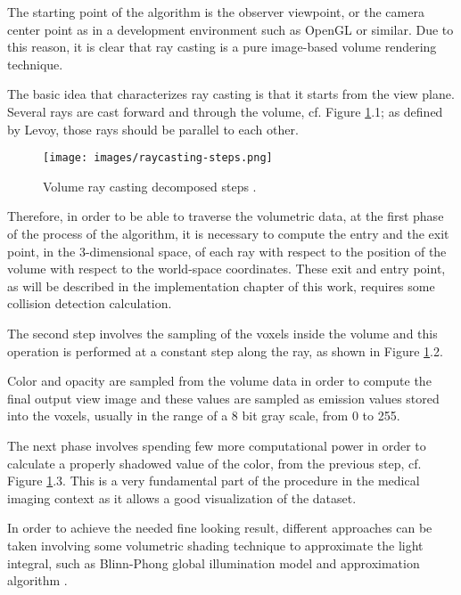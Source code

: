 \documentclass[12pt,a4paper]{extarticle}
\newcommand{\linespace}{\vspace{0pt}}
\begin{document}
The starting point of the algorithm is the observer viewpoint, or the camera center point as in a development environment such as OpenGL or similar. Due to this reason, it is clear that ray casting is a pure image-based volume rendering technique.
\linespace

The basic idea that characterizes ray casting is that it starts from the view plane. Several rays are cast forward and through the volume, cf. Figure \ref{fig:raycastingsteps}.1; as defined by Levoy, those rays should be parallel to each other.

\begin{figure}[hbtp]
\centering
\texttt{[image: images/raycasting-steps.png]}
\caption{Volume ray casting decomposed steps \cite{wiki_ray}.}
\label{fig:raycastingsteps}
\end{figure}

Therefore, in order to be able to traverse the volumetric data, at the first phase of the process of the algorithm, it is necessary to compute the entry and the exit point, in the 3-dimensional space, of each ray with respect to the position of the volume with respect to the world-space coordinates. %
These exit and entry point, as will be described in the implementation chapter of this work, requires some collision detection calculation. 
\linespace

The second step involves the sampling of the voxels inside the volume and this operation is performed at a constant step along the ray, as shown in Figure \ref{fig:raycastingsteps}.2.

Color and opacity are sampled from the volume data in order to compute the final output view image and these values are sampled as emission values stored into the voxels, usually in the range of a 8 bit gray scale, from 0 to 255.
\linespace

The next phase involves spending few more computational power in order to calculate a properly shadowed value of the color, from the previous step, cf. Figure \ref{fig:raycastingsteps}.3. This is a very fundamental part of the procedure in the medical imaging context as it allows a good visualization of the dataset.

In order to achieve the needed fine looking result, different approaches can be taken involving some volumetric shading technique to approximate the light integral, such as Blinn-Phong global illumination model and approximation algorithm \cite{levoy_1988:4}.
\linespace
\end{document}
